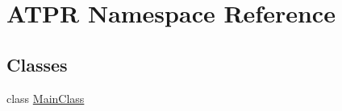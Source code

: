 \hypertarget{namespace_a_t_p_r}{}\section{A\+T\+PR Namespace Reference}
\label{namespace_a_t_p_r}
\subsection*{Classes}
\begin{DoxyCompactItemize}
\item 
class \hyperlink{class_a_t_p_r_1_1_main_class}{Main\+Class}
\end{DoxyCompactItemize}
